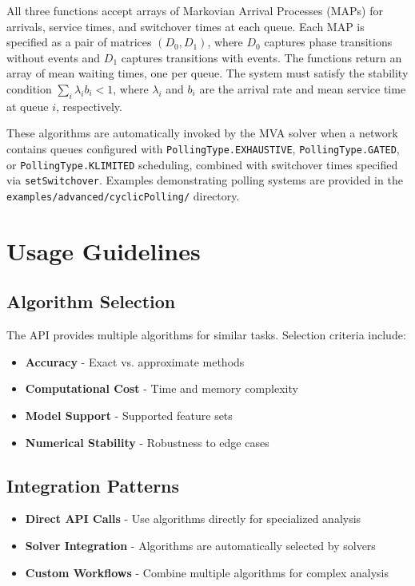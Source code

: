 All three functions accept arrays of Markovian Arrival Processes (MAPs) for arrivals, service times, and switchover times at each queue. Each MAP is specified as a pair of matrices $(D_0, D_1)$, where $D_0$ captures phase transitions without events and $D_1$ captures transitions with events. The functions return an array of mean waiting times, one per queue. The system must satisfy the stability condition $\sum_i \lambda_i b_i < 1$, where $\lambda_i$ and $b_i$ are the arrival rate and mean service time at queue $i$, respectively.

These algorithms are automatically invoked by the MVA solver when a network contains queues configured with \texttt{PollingType.EXHAUSTIVE}, \texttt{PollingType.GATED}, or \texttt{PollingType.KLIMITED} scheduling, combined with switchover times specified via \texttt{setSwitchover}. Examples demonstrating polling systems are provided in the \texttt{examples/advanced/cyclicPolling/} directory.

\section{Usage Guidelines}

\subsection{Algorithm Selection}
The API provides multiple algorithms for similar tasks. Selection criteria include:
\begin{itemize}
\item \textbf{Accuracy} - Exact vs. approximate methods
\item \textbf{Computational Cost} - Time and memory complexity
\item \textbf{Model Support} - Supported feature sets
\item \textbf{Numerical Stability} - Robustness to edge cases
\end{itemize}

\subsection{Integration Patterns}
\begin{itemize}
\item \textbf{Direct API Calls} - Use algorithms directly for specialized analysis
\item \textbf{Solver Integration} - Algorithms are automatically selected by solvers
\item \textbf{Custom Workflows} - Combine multiple algorithms for complex analysis
\end{itemize}

